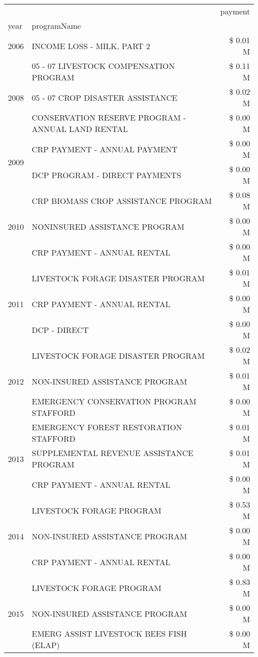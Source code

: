 \begin{tabular}{llr}
\toprule
 &  & payment \\
year & programName &  \\
\midrule
2006 & INCOME LOSS - MILK, PART 2 & \$ 0.01 M \\
\cline{1-3}
\multirow[t]{3}{*}{2008} & 05 - 07 LIVESTOCK COMPENSATION PROGRAM & \$ 0.11 M \\
 & 05 - 07 CROP DISASTER ASSISTANCE & \$ 0.02 M \\
 & CONSERVATION RESERVE PROGRAM - ANNUAL LAND RENTAL & \$ 0.00 M \\
\cline{1-3}
\multirow[t]{2}{*}{2009} & CRP PAYMENT - ANNUAL PAYMENT & \$ 0.00 M \\
 & DCP PROGRAM - DIRECT PAYMENTS & \$ 0.00 M \\
\cline{1-3}
\multirow[t]{3}{*}{2010} & CRP BIOMASS CROP ASSISTANCE PROGRAM & \$ 0.08 M \\
 & NONINSURED ASSISTANCE PROGRAM & \$ 0.00 M \\
 & CRP PAYMENT - ANNUAL RENTAL & \$ 0.00 M \\
\cline{1-3}
\multirow[t]{3}{*}{2011} & LIVESTOCK FORAGE DISASTER PROGRAM & \$ 0.01 M \\
 & CRP PAYMENT - ANNUAL RENTAL & \$ 0.00 M \\
 & DCP - DIRECT & \$ 0.00 M \\
\cline{1-3}
\multirow[t]{3}{*}{2012} & LIVESTOCK FORAGE DISASTER PROGRAM & \$ 0.02 M \\
 & NON-INSURED ASSISTANCE PROGRAM & \$ 0.01 M \\
 & EMERGENCY CONSERVATION PROGRAM STAFFORD & \$ 0.00 M \\
\cline{1-3}
\multirow[t]{3}{*}{2013} & EMERGENCY FOREST RESTORATION STAFFORD & \$ 0.01 M \\
 & SUPPLEMENTAL REVENUE ASSISTANCE PROGRAM & \$ 0.01 M \\
 & CRP PAYMENT - ANNUAL RENTAL & \$ 0.00 M \\
\cline{1-3}
\multirow[t]{3}{*}{2014} & LIVESTOCK FORAGE PROGRAM & \$ 0.53 M \\
 & NON-INSURED ASSISTANCE PROGRAM & \$ 0.00 M \\
 & CRP PAYMENT - ANNUAL RENTAL & \$ 0.00 M \\
\cline{1-3}
\multirow[t]{3}{*}{2015} & LIVESTOCK FORAGE PROGRAM & \$ 0.83 M \\
 & NON-INSURED ASSISTANCE PROGRAM & \$ 0.00 M \\
 & EMERG ASSIST LIVESTOCK BEES FISH (ELAP) & \$ 0.00 M \\

\end{tabular}
